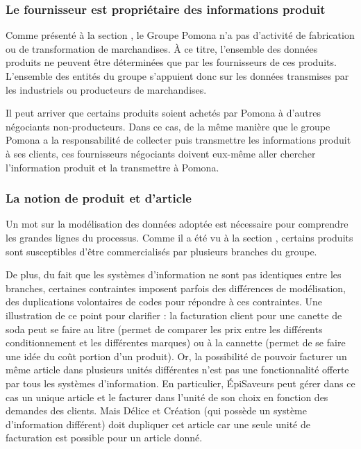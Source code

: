             \subsubsection{Le fournisseur est propriétaire des informations produit}

            Comme présenté à la section , le Groupe Pomona n'a pas d'activité de fabrication ou de transformation de marchandises.
            \`{A} ce titre, l'ensemble des données produits ne peuvent être déterminées que par les fournisseurs de ces produits.
            L'ensemble des entités du groupe s'appuient donc sur les données transmises par les industriels ou producteurs de marchandises.

            Il peut arriver que certains produits soient achetés par Pomona à d'autres négociants non-producteurs.
            Dans ce cas, de la même manière que le groupe Pomona a la responsabilité de collecter puis transmettre les informations produit à ses clients, ces fournisseurs négociants doivent eux-même aller chercher l'information produit et la transmettre à Pomona.


            \subsubsection{La notion de produit et d'article}
            \label{produit_article}

            Un mot sur la modélisation des données adoptée est nécessaire pour comprendre les grandes lignes du processus.
            Comme il a été vu à la section , certains produits sont susceptibles d'être commercialisés par plusieurs branches du groupe.
            
            De plus, du fait que les systèmes d'information ne sont pas identiques entre les branches, certaines contraintes imposent parfois des différences de modélisation, des duplications volontaires de codes pour répondre à ces contraintes.
            Une illustration de ce point pour clarifier : la facturation client pour une canette de soda peut se faire au litre (permet de comparer les prix entre les différents conditionnement et les différentes marques) ou à la cannette (permet de se faire une idée du coût portion d'un produit).
            Or, la possibilité de pouvoir facturer un même article dans plusieurs unités différentes n'est pas une fonctionnalité offerte par tous les systèmes d'information.
            En particulier, \'{E}piSaveurs peut gérer dans ce cas un unique article et le facturer dans l'unité de son choix en fonction des demandes des clients.
            Mais Délice et Création (qui possède un système d'information différent) doit dupliquer cet article car une seule unité de facturation est possible pour un article donné.

